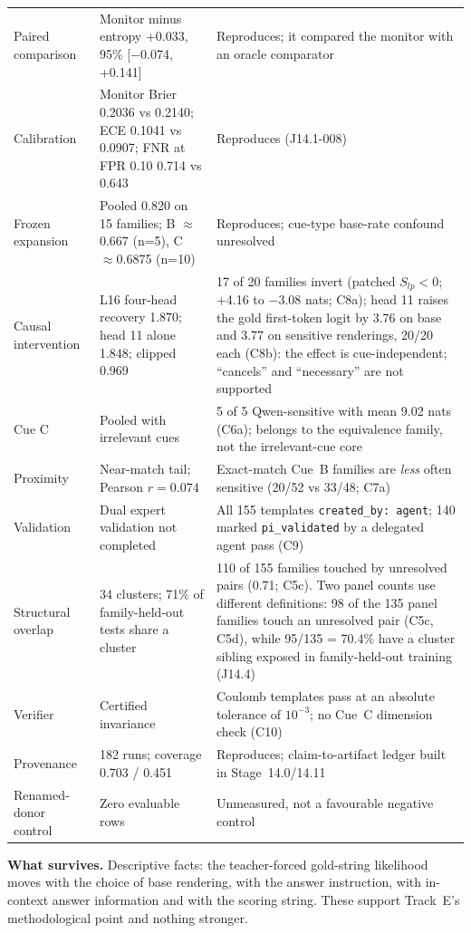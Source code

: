 \documentclass[10pt,a4paper]{article}
\begin{document}
\begin{center}
\begin{longtable}{@{}P{2.8cm}P{5.6cm}P{7.4cm}@{}}
Paired comparison & Monitor minus entropy +0.033, 95\% [$-$0.074, +0.141] & Reproduces; it compared the monitor with an oracle comparator \\
Calibration & Monitor Brier 0.2036 vs 0.2140; ECE 0.1041 vs 0.0907; FNR at FPR 0.10 0.714 vs 0.643 & Reproduces (J14.1-008) \\
Frozen expansion & Pooled 0.820 on 15 families; B $\approx$0.667 (n=5), C $\approx$0.6875 (n=10) & Reproduces; cue-type base-rate confound unresolved \\
Causal intervention & L16 four-head recovery 1.870; head 11 alone 1.848; clipped 0.969 & 17 of 20 families invert (patched $S_{lp}<0$; +4.16 to $-$3.08 nats; C8a); head 11 raises the gold first-token logit by 3.76 on base and 3.77 on sensitive renderings, 20/20 each (C8b): the effect is cue-independent; ``cancels'' and ``necessary'' are not supported \\
Cue C & Pooled with irrelevant cues & 5 of 5 Qwen-sensitive with mean 9.02 nats (C6a); belongs to the equivalence family, not the irrelevant-cue core \\
Proximity & Near-match tail; Pearson $r=0.074$ & Exact-match Cue~B families are \emph{less} often sensitive (20/52 vs 33/48; C7a) \\
Validation & Dual expert validation not completed & All 155 templates \texttt{created\_by: agent}; 140 marked \texttt{pi\_validated} by a delegated agent pass (C9) \\
Structural overlap & 34 clusters; 71\% of family-held-out tests share a cluster & 110 of 155 families touched by unresolved pairs (0.71; C5c). Two panel counts use different definitions: 98 of the 135 panel families touch an unresolved pair (C5c, C5d), while 95/135 = 70.4\% have a cluster sibling exposed in family-held-out training (J14.4) \\
Verifier & Certified invariance & Coulomb templates pass at an absolute tolerance of $10^{-3}$; no Cue~C dimension check (C10) \\
Provenance & 182 runs; coverage 0.703 / 0.451 & Reproduces; claim-to-artifact ledger built in Stage~14.0/14.11 \\
Renamed-donor control & Zero evaluable rows & Unmeasured, not a favourable negative control \\
\bottomrule
\end{longtable}
\end{center}

\textbf{What survives.} Descriptive facts: the teacher-forced gold-string likelihood moves with the choice of base
rendering, with the answer instruction, with in-context answer information and with the scoring string. These
support Track~E's methodological point and nothing stronger.
\end{document}
